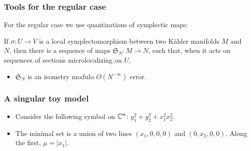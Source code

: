 \documentclass[mathserif]{beamer}
\newcommand{\spline}{\hline}
\begin{document}
\begin{frame}
  \frametitle{Tools for the regular case}
  For the regular case we use quantizations of symplectic maps:

If $\sigma:U\to V$ is a local symplectomorphism between two K\"ahler
manifolds $M$ and $N$, then there is a sequence of maps
$\mathfrak{S}_N:M\to N$, such that, when it acts on sequences of
sections microlocalizing on $U$, 

\begin{itemize}
\item $\mathfrak{S}_N$ is an isometry modulo $O(N^{-\infty})$ error.
\end{itemize}

\end{frame}

\begin{frame}
  \frametitle{A singular toy model}
\begin{itemize}
  \item Consider the following symbol on $\mathbb{C}^n$: $y_1^2+y_2^2+x_1^2x_2^2$.

\item The minimal set is a union of two lines $(x_1,0,0,0)$ and
$(0,x_2,0,0)$. Along the first, $\mu=|x_1|$.

\end{itemize}
\end{frame}

	
\end{document}

